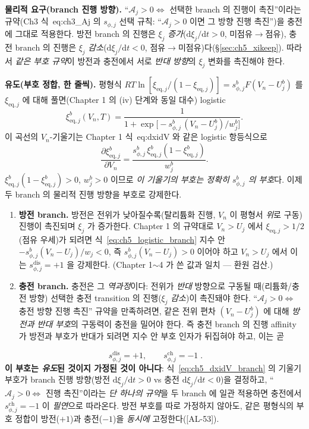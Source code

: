 \documentclass[11pt,a4paper]{article}
\newcommand{\dd}{\mathrm{d}}
\newcommand{\eq}{\mathrm{eq}}
\newcommand{\dis}{\mathrm{dis}}
\newcommand{\chg}{\mathrm{ch}}
\newcommand{\AL}[1]{\textsf{[AL-#1]}}
\begin{document}
\textbf{물리적 요구(branch 진행 방향).} ``$\mathcal A_j>0\Leftrightarrow$ 선택한 branch 의 진행이 촉진''이라는
규약(Ch3 식~eq:ch3\_Aj 의 $s_{\phi,j}$ 선택 규칙: ``$\mathcal A_j>0$ 이면 그 방향 진행 촉진'')을 충전에 그대로
적용한다. 방전 branch 의 진행은 $\xi_j$ \emph{증가}($\dd\xi_j/\dd t>0$, 미점유$\to$점유), 충전 branch 의 진행은
$\xi_j$ \emph{감소}($\dd\xi_j/\dd t<0$, 점유$\to$미점유)다(\S\ref{sec:ch5_xikeep}). 따라서 \emph{같은 부호 규약}이
방전과 충전에서 서로 \emph{반대 방향}의 $\xi_j$ 변화를 촉진해야 한다.

\textbf{유도(부호 정합, 한 줄씩).} 평형식 $RT\ln[\xi_{\eq,j}/(1-\xi_{\eq,j})]=s_{\phi,j}^b F(V_n-U_j^b)$ 를
$\xi_{\eq,j}$ 에 대해 풀면(Chapter 1 의 (iv) 단계와 동일 대수) logistic
\begin{equation}
\xi_{\eq,j}^b(V_n,T)=\frac{1}{1+\exp\!\big[-s_{\phi,j}^b\,(V_n-U_j^b)/w_j^b\big]}.
\label{eq:ch5_logistic_branch}
\end{equation}
이 곡선의 $V_n$-기울기는 Chapter 1 식~eq:dxidV 와 같은 logistic 항등식으로
\begin{equation}
\frac{\partial\xi_{\eq,j}^b}{\partial V_n}=\frac{s_{\phi,j}^b\,\xi_{\eq,j}^b(1-\xi_{\eq,j}^b)}{w_j^b}.
\label{eq:ch5_dxidV_branch}
\end{equation}
$\xi_{\eq,j}^b(1-\xi_{\eq,j}^b)>0$, $w_j^b>0$ 이므로 \emph{이 기울기의 부호는 정확히 $s_{\phi,j}^b$ 의 부호}다.
이제 두 branch 의 물리적 진행 방향을 부호로 강제한다.
\begin{enumerate}[label=(\roman*),leftmargin=2.2em]
\item \textbf{방전 branch.} 방전은 전위가 낮아질수록(탈리튬화 진행, $V_n$ 이 평형서 \emph{위}로 구동) 진행이
  촉진되며 $\xi_j$ 가 증가한다. Chapter 1 의 규약대로 $V_n>U_j$ 에서 $\xi_{\eq,j}>1/2$(점유 우세)가 되려면
  식~\eqref{eq:ch5_logistic_branch} 지수 안 $-s_{\phi,j}^b(V_n-U_j)/w_j<0$, 즉 $s_{\phi,j}^b(V_n-U_j)>0$ 이어야
  하고 $V_n>U_j$ 에서 이는 $s_{\phi,j}^\dis=+1$ 을 강제한다. (Chapter 1$\sim$4 가 쓴 값과 일치 — 환원 검산.)
\item \textbf{충전 branch.} 충전은 그 \emph{역과정}이다: 전위가 \emph{반대} 방향으로 구동될 때(리튬화/충전
  방향) 선택한 충전 transition 의 진행($\xi_j$ \emph{감소})이 촉진돼야 한다. ``$\mathcal A_j>0\Leftrightarrow$
  충전 방향 진행 촉진'' 규약을 만족하려면, 같은 전위 편차 $(V_n-U_j^b)$ 에 대해 \emph{방전과 반대 부호}의
  구동력이 충전을 밀어야 한다. 즉 충전 branch 의 진행 affinity 가 방전과 부호가 반대가 되려면 지수 안 부호
  인자가 뒤집혀야 하고, 이는 곧
\end{enumerate}
\begin{equation}
\boxed{\;s_{\phi,j}^\dis=+1,\qquad s_{\phi,j}^\chg=-1\;.}
\label{eq:ch5_schg}
\end{equation}
\textbf{이 부호는 \emph{유도}된 것이지 가정된 것이 아니다}: 식~\eqref{eq:ch5_dxidV_branch} 의 기울기 부호가
branch 진행 방향(방전 $\dd\xi_j/\dd t>0$ vs 충전 $\dd\xi_j/\dd t<0$)을 결정하고, ``$\mathcal A_j>0\Leftrightarrow$
진행 촉진''이라는 \emph{단 하나의 규약}을 두 branch 에 일관 적용하면 충전에서 $s_{\phi,j}^\chg=-1$ 이
\emph{필연}으로 따라온다. 방전 부호를 따로 가정하지 않아도, 같은 평형식의 부호 정합이 방전($+1$)과 충전($-1$)을
\emph{동시에} 고정한다(\AL{53}).
\end{document}
